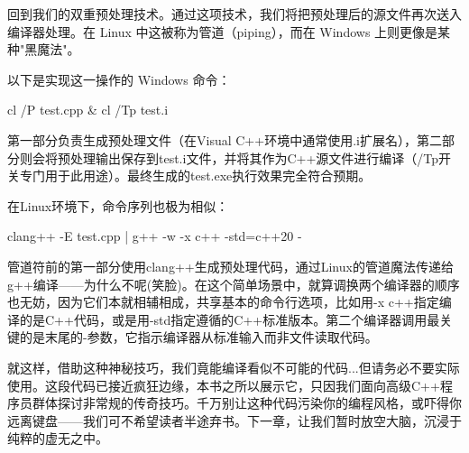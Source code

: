 回到我们的双重预处理技术。通过这项技术，我们将把预处理后的源文件再次送入编译器处理。在 Linux 中这被称为管道（piping），而在 Windows 上则更像是某种"黑魔法"。

以下是实现这一操作的 Windows 命令：

\begin{shell}
cl /P test.cpp & cl /Tp test.i
\end{shell}

第一部分负责生成预处理文件（在Visual C++环境中通常使用.i扩展名），第二部分则会将预处理输出保存到test.i文件，并将其作为C++源文件进行编译（/Tp开关专门用于此用途）。最终生成的test.exe执行效果完全符合预期。

在Linux环境下，命令序列也极为相似：

\begin{shell}
clang++ -E test.cpp | g++ -w -x c++ -std=c++20 -
\end{shell}

管道符前的第一部分使用clang++生成预处理代码，通过Linux的管道魔法传递给g++编译——为什么不呢(笑脸)。在这个简单场景中，就算调换两个编译器的顺序也无妨，因为它们本就相辅相成，共享基本的命令行选项，比如用-x c++指定编译的是C++代码，或是用-std指定遵循的C++标准版本。第二个编译器调用最关键的是末尾的-参数，它指示编译器从标准输入而非文件读取代码。

就这样，借助这种神秘技巧，我们竟能编译看似不可能的代码...但请务必不要实际使用。这段代码已接近疯狂边缘，本书之所以展示它，只因我们面向高级C++程序员群体探讨非常规的传奇技巧。千万别让这种代码污染你的编程风格，或吓得你远离键盘——我们可不希望读者半途弃书。下一章，让我们暂时放空大脑，沉浸于纯粹的虚无之中。














